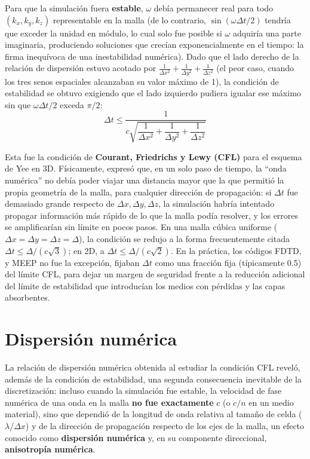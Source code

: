 Para que la simulación fuera \textbf{estable}, $\omega$ debía permanecer real para todo $(k_x, k_y, k_z)$ representable en la malla (de lo contrario, $\sin(\omega\Delta t/2)$ tendría que exceder la unidad en módulo, lo cual solo fue posible si $\omega$ adquiría una parte imaginaria, produciendo soluciones que crecían exponencialmente en el tiempo: la firma inequívoca de una inestabilidad numérica). Dado que el lado derecho de la relación de dispersión estuvo acotado por $\frac{1}{\Delta x^2}+\frac{1}{\Delta y^2}+\frac{1}{\Delta z^2}$ (el peor caso, cuando los tres senos espaciales alcanzaban su valor máximo de 1), la condición de estabilidad se obtuvo exigiendo que el lado izquierdo pudiera igualar ese máximo sin que $\omega\Delta t/2$ exceda $\pi/2$:
\begin{equation}
    \boxed{\Delta t \leq \frac{1}{c\sqrt{\dfrac{1}{\Delta x^2}+\dfrac{1}{\Delta y^2}+\dfrac{1}{\Delta z^2}}}}
\end{equation}

Esta fue la condición de \textbf{Courant, Friedrichs y Lewy (CFL)} para el esquema de Yee en 3D. Físicamente, expresó que, en un solo paso de tiempo, la ``onda numérica'' no debía poder viajar una distancia mayor que la que permitió la propia geometría de la malla, para cualquier dirección de propagación: si $\Delta t$ fue demasiado grande respecto de $\Delta x, \Delta y, \Delta z$, la simulación habría intentado propagar información más rápido de lo que la malla podía resolver, y los errores se amplificarían sin límite en pocos pasos. En una malla cúbica uniforme ($\Delta x=\Delta y=\Delta z=\Delta$), la condición se redujo a la forma frecuentemente citada $\Delta t\leq \Delta/(c\sqrt{3})$; en 2D, a $\Delta t\leq\Delta/(c\sqrt{2})$. En la práctica, los códigos FDTD, y MEEP no fue la excepción, fijaban $\Delta t$ como una fracción fija (típicamente 0.5) del límite CFL, para dejar un margen de seguridad frente a la reducción adicional del límite de estabilidad que introducían los medios con pérdidas y las capas absorbentes.

\section{Dispersión numérica}
La relación de dispersión numérica obtenida al estudiar la condición CFL reveló, además de la condición de estabilidad, una segunda consecuencia inevitable de la discretización: incluso cuando la simulación fue estable, la velocidad de fase numérica de una onda en la malla \textbf{no fue exactamente} $c$ (o $c/n$ en un medio material), sino que dependió de la longitud de onda relativa al tamaño de celda ($\lambda/\Delta x$) y de la dirección de propagación respecto de los ejes de la malla, un efecto conocido como \textbf{dispersión numérica} y, en su componente direccional, \textbf{anisotropía numérica}. 

